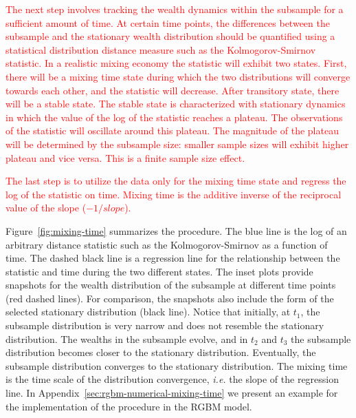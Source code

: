\documentclass[11pt]{article}
\newcommand{\ie}{{\it i.e.}\xspace}
\newcommand{\Fref}[1]{Figure~\ref{fig:#1}}
\numberwithin{equation}{section}
\begin{document}
\textcolor{red}{The next step involves tracking the wealth dynamics within the subsample for a sufficient amount of time. At certain time points, the differences between the subsample and the stationary wealth distribution should be quantified using a statistical distribution distance measure such as the Kolmogorov-Smirnov statistic. In a realistic mixing economy the statistic will exhibit two states. First, there will be a mixing time state during which the two distributions will converge towards each other, and the statistic will decrease. After transitory state, there will be a stable state. The stable state is characterized with stationary dynamics in which the value of the log of the statistic reaches a plateau. The observations of the statistic will oscillate around this plateau. The magnitude of the plateau will be determined by the subsample size: smaller sample sizes will exhibit higher plateau and vice versa. This is a finite sample size effect.}

\textcolor{red}{The last step is to utilize the data only for the mixing time state and regress the log of the statistic on time. Mixing time is the additive inverse of the reciprocal value of the slope ($-1/slope$).}

\Fref{mixing-time} summarizes the procedure. The blue line is the log of an arbitrary distance statistic such as the Kolmogorov-Smirnov as a function of time. The dashed black line is a regression line for the relationship between the statistic and time during the two different states. The inset plots provide snapshots for the wealth distribution of the subsample at different time points (red dashed lines). For comparison, the snapshots also include the form of the selected stationary distribution (black line). Notice that initially, at $t_1$, the subsample distribution is very narrow and does not resemble the stationary distribution. The wealths in the subsample evolve, and in $t_2$ and $t_3$ the subsample distribution becomes closer to the stationary distribution. Eventually, the subsample distribution converges to the stationary distribution. The mixing time is the time scale of the distribution convergence, \ie the slope of the regression line. In Appendix~\ref{sec:rgbm-numerical-mixing-time} we present an example for the implementation of the procedure in the RGBM model.
\end{document}

